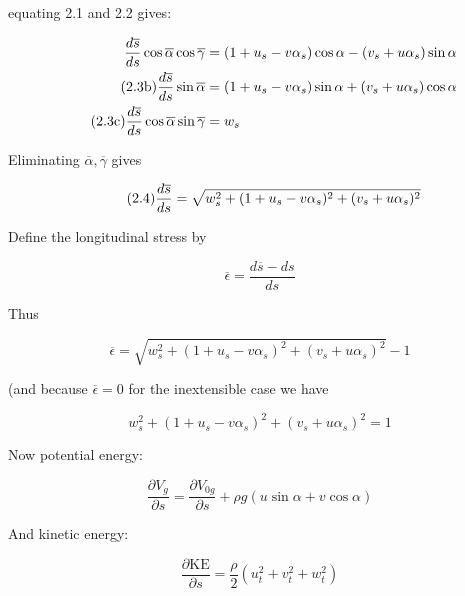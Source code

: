 \documentclass{article}
\begin{document}
equating 2.1 and 2.2 gives:

\begin{align}
  \frac{d\overline{s}}{d{s}}\cos\overline{\alpha}\cos\overline{\gamma} &=
  (1 + u_s -v\alpha_s)\cos\alpha
  -(v_s     +u\alpha_s)\sin\alpha\\
\tag{2.3b}\label{2.3b}
\frac{d\overline{s}}{d{s}}\sin\overline{\alpha}  &= 
  (1 + u_s -v\alpha_s)\sin\alpha
+(v_s     +u\alpha_s)\cos\alpha\\
\tag{2.3c}\label{2.3c}
\frac{d\overline{s}}{d{s}}\cos\overline{\alpha}\sin\overline{\gamma} &=
w_s
\end{align}

Eliminating $\overline{\alpha},\overline{\gamma}$ gives

\begin{equation}\tag{2.4}\label{2.4}
  \frac{d\overline{s}}{d{s}}=\sqrt{
    w_s^2 + (1 + u_s -v\alpha_s)^2+(v_s+u\alpha_s)^2}
\end{equation}

Define the longitudinal stress by

$$\overline{\epsilon}=\frac{d\overline{s}-ds}{ds}$$

Thus

\begin{equation}\label{2.5}\tag{2.5}
  \overline{\epsilon} = \sqrt{w_s^2 + (1 + u_s -v\alpha_s)^2+(v_s+u\alpha_s)^2}-1
\end{equation}

(and because $\overline{\epsilon}=0$ for the inextensible case we have 

$$w_s^2 + (1 + u_s -v\alpha_s)^2+(v_s+u\alpha_s)^2=1$$


Now potential energy:

\begin{equation}\label{2.6}\tag{2.6}
  \frac{\partial V_g}{\partial s}  = \frac{\partial V_{0g}}{\partial s} +
    \rho g(u\sin\alpha + v\cos\alpha)
\end{equation}

And kinetic energy:

\begin{equation}\label{2.7}\tag{2.7}
  \frac{\partial\mathrm{KE}}{\partial s}=\frac{\rho}{2}\left(
  u_t^2 +  v_t^2 +  w_t^2\right)
  \end{equation}
\end{document}
